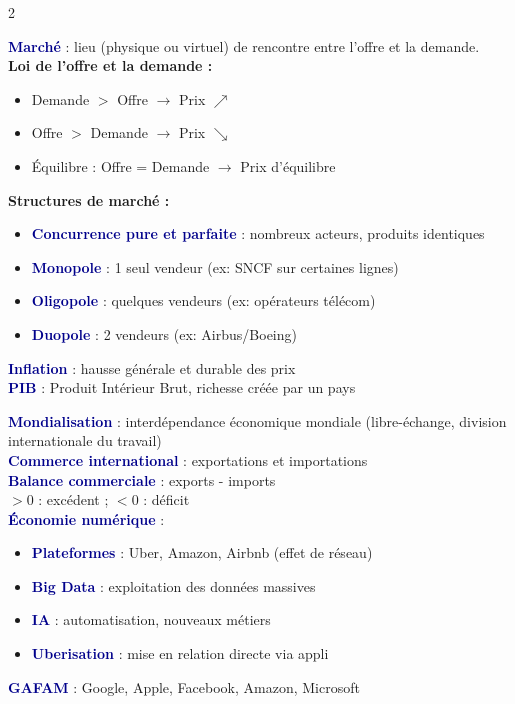 \documentclass[a4paper,10pt]{article}
\newcommand{\key}[1]{\textbf{\textcolor{darkblue}{#1}}}
\begin{document}
\begin{multicols}{2}
\begin{tcolorbox}[basebox, colframe=darkblue, title=2. ÉCONOMIE — Marchés et prix]
\key{Marché} : lieu (physique ou virtuel) de rencontre entre l'offre et la demande.\\[4pt]
\textbf{Loi de l'offre et la demande :}
\begin{itemize}
  \item Demande $>$ Offre $\to$ Prix $\nearrow$
  \item Offre $>$ Demande $\to$ Prix $\searrow$
  \item Équilibre : Offre = Demande $\to$ Prix d'équilibre
\end{itemize}
\vspace{4pt}
\textbf{Structures de marché :}
\begin{itemize}
  \item \key{Concurrence pure et parfaite} : nombreux acteurs, produits identiques
  \item \key{Monopole} : 1 seul vendeur (ex: SNCF sur certaines lignes)
  \item \key{Oligopole} : quelques vendeurs (ex: opérateurs télécom)
  \item \key{Duopole} : 2 vendeurs (ex: Airbus/Boeing)
\end{itemize}
\vspace{4pt}
\key{Inflation} : hausse générale et durable des prix \\
\key{PIB} : Produit Intérieur Brut, richesse créée par un pays
\end{tcolorbox}

\begin{tcolorbox}[basebox, colframe=teal, title=3. ÉCONOMIE — Mondialisation et numérique]
\key{Mondialisation} : interdépendance économique mondiale (libre-échange, division internationale du travail) \\[4pt]
\key{Commerce international} : exportations et importations \\
\key{Balance commerciale} : exports - imports \\
\quad $> 0$ : excédent ; $< 0$ : déficit \\[4pt]
\key{Économie numérique} :
\begin{itemize}
  \item \key{Plateformes} : Uber, Amazon, Airbnb (effet de réseau)
  \item \key{Big Data} : exploitation des données massives
  \item \key{IA} : automatisation, nouveaux métiers
  \item \key{Uberisation} : mise en relation directe via appli
\end{itemize}
\vspace{4pt}
\key{GAFAM} : Google, Apple, Facebook, Amazon, Microsoft
\end{tcolorbox}


\end{multicols}
\end{document}

